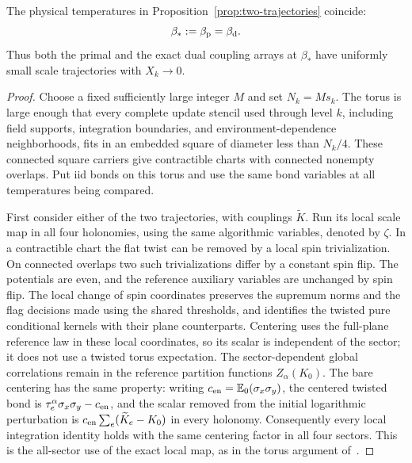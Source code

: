 \begin{proposition}
\label{prop:matching}
The physical temperatures in Proposition~\ref{prop:two-trajectories}
coincide:
\begin{equation}
             \beta_*:=\beta_{\rm p}=\beta_{\rm d}.
 \label{eq:matched-temperature}
\end{equation}
Thus both the primal and the exact dual coupling arrays at $\beta_*$
have uniformly small scale trajectories with $X_k\to0$.
\end{proposition}

\begin{proof}
Choose a fixed sufficiently large integer $M$ and set $N_k=Ms_k$.
The torus is large enough that every complete update stencil used
through level $k$, including field supports, integration boundaries,
and environment-dependence neighborhoods, fits in an embedded square
of diameter less than $N_k/4$. These connected square carriers give
contractible charts with connected nonempty overlaps. Put iid bonds
on this torus and use the same
bond variables at all temperatures being compared.

First consider either of the two trajectories, with couplings
$\widetilde K$. Run its local scale map in all four holonomies,
using the same algorithmic variables, denoted by $\zeta$. In a
contractible chart the flat twist can be removed by a local spin
trivialization. On connected overlaps two such trivializations differ
by a constant spin flip. The potentials are even, and the reference
auxiliary variables are unchanged by spin flip. The local change of
spin coordinates preserves the supremum norms and the flag decisions
made using the shared thresholds, and identifies the twisted pure
conditional kernels with their plane counterparts.
Centering uses the full-plane reference law in these local coordinates,
so its scalar is independent of the sector; it does not use a twisted
torus expectation. The sector-dependent global correlations remain in
the reference partition functions $Z_\alpha(K_0)$. The bare centering has
the same property: writing $c_{\rm en}=\mathbb E_0(\sigma_x\sigma_y)$,
the centered twisted bond is
$\tau_e^\alpha\sigma_x\sigma_y-c_{\rm en}$, and the scalar removed
from the initial logarithmic perturbation is
$c_{\rm en}\sum_e(\widetilde K_e-K_0)$ in every holonomy.
Consequently every local integration identity holds with the same
centering factor in all four sectors. This is the all-sector use of
the exact local map, as in the torus argument of~\cite[Section~8]{R}.


\end{proof}
